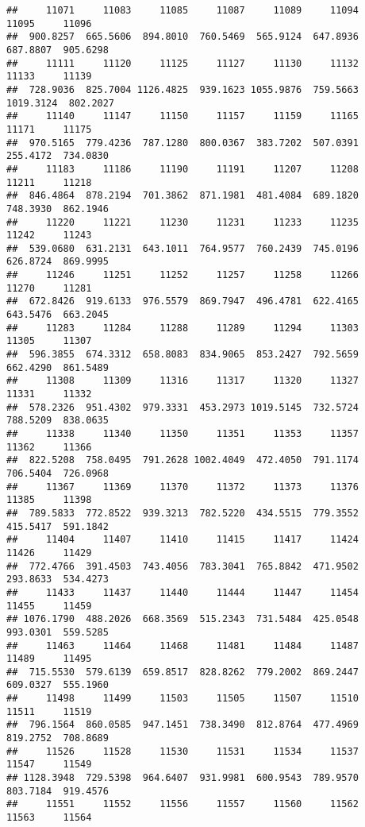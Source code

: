 \documentclass[
]{article}
\begin{document}
\begin{verbatim}
##     11071     11083     11085     11087     11089     11094     11095     11096 
##  900.8257  665.5606  894.8010  760.5469  565.9124  647.8936  687.8807  905.6298 
##     11111     11120     11125     11127     11130     11132     11133     11139 
##  728.9036  825.7004 1126.4825  939.1623 1055.9876  759.5663 1019.3124  802.2027 
##     11140     11147     11150     11157     11159     11165     11171     11175 
##  970.5165  779.4236  787.1280  800.0367  383.7202  507.0391  255.4172  734.0830 
##     11183     11186     11190     11191     11207     11208     11211     11218 
##  846.4864  878.2194  701.3862  871.1981  481.4084  689.1820  748.3930  862.1946 
##     11220     11221     11230     11231     11233     11235     11242     11243 
##  539.0680  631.2131  643.1011  764.9577  760.2439  745.0196  626.8724  869.9995 
##     11246     11251     11252     11257     11258     11266     11270     11281 
##  672.8426  919.6133  976.5579  869.7947  496.4781  622.4165  643.5476  663.2045 
##     11283     11284     11288     11289     11294     11303     11305     11307 
##  596.3855  674.3312  658.8083  834.9065  853.2427  792.5659  662.4290  861.5489 
##     11308     11309     11316     11317     11320     11327     11331     11332 
##  578.2326  951.4302  979.3331  453.2973 1019.5145  732.5724  788.5209  838.0635 
##     11338     11340     11350     11351     11353     11357     11362     11366 
##  822.5208  758.0495  791.2628 1002.4049  472.4050  791.1174  706.5404  726.0968 
##     11367     11369     11370     11372     11373     11376     11385     11398 
##  789.5833  772.8522  939.3213  782.5220  434.5515  779.3552  415.5417  591.1842 
##     11404     11407     11410     11415     11417     11424     11426     11429 
##  772.4766  391.4503  743.4056  783.3041  765.8842  471.9502  293.8633  534.4273 
##     11433     11437     11440     11444     11447     11454     11455     11459 
## 1076.1790  488.2026  668.3569  515.2343  731.5484  425.0548  993.0301  559.5285 
##     11463     11464     11468     11481     11484     11487     11489     11495 
##  715.5530  579.6139  659.8517  828.8262  779.2002  869.2447  609.0327  555.1960 
##     11498     11499     11503     11505     11507     11510     11511     11519 
##  796.1564  860.0585  947.1451  738.3490  812.8764  477.4969  819.2752  708.8689 
##     11526     11528     11530     11531     11534     11537     11547     11549 
## 1128.3948  729.5398  964.6407  931.9981  600.9543  789.9570  803.7184  919.4576 
##     11551     11552     11556     11557     11560     11562     11563     11564 

\end{verbatim}
\end{document}
